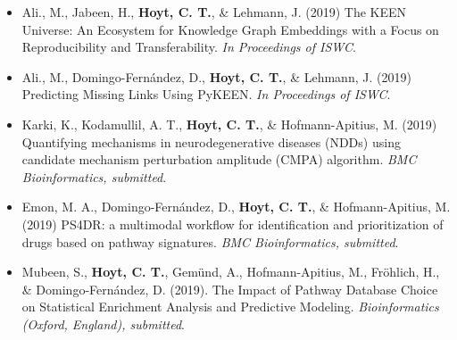\begin{itemize}
    \item Ali., M., Jabeen, H., \textbf{Hoyt, C. T.}, \& Lehmann, J. (2019) The KEEN Universe: An Ecosystem for Knowledge Graph Embeddings with a Focus on Reproducibility and Transferability. \textit{In Proceedings of ISWC}.
    \item Ali., M., Domingo-Fern\'{a}ndez, D., \textbf{Hoyt, C. T.}, \& Lehmann, J. (2019) Predicting Missing Links Using PyKEEN. \textit{In Proceedings of ISWC}.
    \item Karki, K., Kodamullil, A. T., \textbf{Hoyt, C. T.}, \& Hofmann-Apitius, M. (2019) Quantifying mechanisms in neurodegenerative diseases (NDDs) using candidate mechanism perturbation amplitude (CMPA) algorithm. \textit{BMC Bioinformatics, submitted}.
    \item Emon, M. A., Domingo-Fern\'{a}ndez, D., \textbf{Hoyt, C. T.}, \& Hofmann-Apitius, M. (2019) PS4DR: a multimodal workflow for identification and prioritization of drugs based on pathway signatures. \textit{BMC Bioinformatics, submitted}.
    \item Mubeen, S., \textbf{Hoyt, C. T.}, Gem\"{u}nd, A., Hofmann-Apitius, M., Fr\"{o}hlich, H., \& Domingo-Fern\'{a}ndez, D. (2019). The Impact of Pathway Database Choice on Statistical Enrichment Analysis and Predictive Modeling. \textit{Bioinformatics (Oxford, England), submitted}.
\end{itemize}